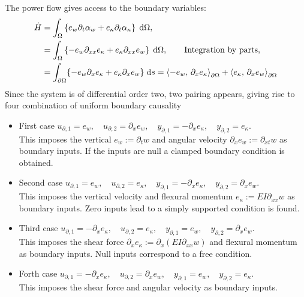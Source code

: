 The power flow gives access to the boundary variables:
\begin{equation}
\begin{aligned}
\dot{H} &= \int_{\Omega} \left\{e_w \partial_t \alpha_w + e_\kappa \partial_t \alpha_\kappa \right\}  \d{\Omega}, \\
&= \int_{\Omega} \left\{-e_w \partial_{xx}e_\kappa + e_\kappa \partial_{xx} e_w \right\} \d{\Omega}, \qquad \text{Integration by parts}, \\
&= \int_{\partial\Omega}\{-e_w \partial_{x}e_\kappa + e_\kappa \partial_{x} e_w \} \d{s}= \inner[\partial\Omega]{-e_w}{\partial_{x}e_\kappa} + \inner[\partial\Omega]{e_\kappa}{\partial_{x}e_w}
\end{aligned}
\end{equation}
Since the system is of differential order two, two pairing appears, giving rise to four combination of uniform boundary causality
\begin{itemize}
	\item {First case} ${u}_{\partial, 1} = e_w, \quad {u}_{\partial, 2} = \partial_x e_w, \quad {y}_{\partial, 1} = -\partial_{x}e_\kappa, \quad {y}_{\partial, 2} = e_\kappa$. \\
	This imposes the vertical $e_w:= \partial_t w$ and angular velocity $\partial_x e_w:= \partial_{xt} w$ as boundary inputs. If the inputs are null a clamped boundary condition is obtained.
	\item {Second case} ${u}_{\partial, 1} = e_w, \quad {u}_{\partial, 2} = e_\kappa, \quad {y}_{\partial, 1} = -\partial_{x}e_\kappa, \quad {y}_{\partial, 2} = \partial_x e_w$. \\
	This imposes the vertical velocity and flexural momentum $e_\kappa:= EI \partial_{xx} w$ as boundary inputs.  Zero inputs lead to a simply supported condition is found.
	\item {Third case} ${u}_{\partial, 1} = -\partial_{x}e_\kappa , \quad {u}_{\partial, 2} = e_\kappa, \quad {y}_{\partial, 1} = e_w, \quad {y}_{\partial, 2} = \partial_x e_w$. \\
	This imposes the shear force $\partial_{x}e_\kappa:= \partial_{x}(EI \partial_{xx}w)$ and flexural momentum as boundary inputs. Null inputs correspond to a free condition.
	\item {Forth case} ${u}_{\partial, 1} = -\partial_{x}e_\kappa , \quad {u}_{\partial, 2} = \partial_{x}e_w, \quad {y}_{\partial, 1} = e_w, \quad {y}_{\partial, 2} = e_\kappa$. \\
	This imposes the shear force and angular velocity as boundary inputs.
\end{itemize} 

